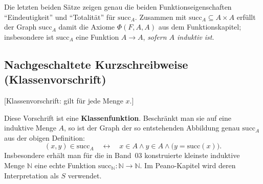 \documentclass[main.tex]{subfiles}
\begin{document}
\begin{tabproof}
\end{tabproof}

\begin{tabproof}
    {}
\end{tabproof}

\begin{remark}
Die letzten beiden Sätze zeigen genau die beiden Funktions\-eigenschaften \enquote{Eindeutigkeit} und 
\enquote{Totalität} für \(\mathrm{succ}_A\). Zusammen mit \(\mathrm{succ}_A \subseteq A\times A\) 
erfüllt der Graph \(\mathrm{succ}_A\) damit die Axiome \(\Phi(F,A,A)\) aus dem Funktionskapitel; 
insbesondere ist \(\mathrm{succ}_A\) eine Funktion \(A\to A\), \emph{sofern \(A\) induktiv ist}.
\end{remark}

\subsection{Nachgeschaltete Kurzschreibweise (Klassenvorschrift)}

[Klassenvorschrift: gilt für jede Menge \(x\).]
\begin{remark}
Diese Vorschrift ist eine \textbf{Klassenfunktion}. 
Beschränkt man sie auf eine induktive Menge \(A\), so ist der Graph der so entstehenden Abbildung genau
\(\mathrm{succ}_A\) aus der obigen Definition:
\[
(x,y)\in \mathrm{succ}_A \quad\leftrightarrow\quad x\in A \land y\in A \land \bigl(y=\mathrm{succ}(x)\bigr).
\]
Insbesondere erhält man für die in Band~03 konstruierte kleinste induktive Menge \(\mathbb{N}\) 
eine echte Funktion \(\mathrm{succ}_{\mathbb{N}}\colon \mathbb{N}\to \mathbb{N}\). 
Im Peano-Kapitel wird deren Interpretation als \(S\) verwendet.
\end{remark}
\end{document}

